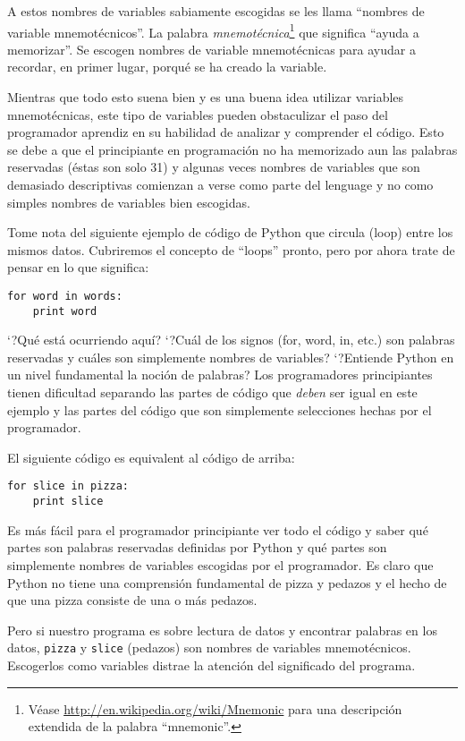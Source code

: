 \begin{ex}
A estos nombres de variables sabiamente escogidas se les llama ``nombres de variable mnemot\'ecnicos''. La palabra \emph{mnemot\'ecnica}\footnote{V\'ease 
\url{http://en.wikipedia.org/wiki/Mnemonic}
para una descripci\'on extendida de la palabra ``mnemonic''.} 
que significa ``ayuda a memorizar''.
Se escogen nombres de variable mnemot\'ecnicas para ayudar a recordar, en primer lugar, porqu\'e se ha creado la variable.

Mientras que todo esto suena bien y es una buena idea utilizar variables mnemot\'ecnicas, este tipo de variables pueden obstaculizar el paso del programador aprendiz en su habilidad de analizar y comprender el c\'odigo. Esto se debe a que el principiante en programaci\'on no ha memorizado aun las palabras reservadas (\'estas son solo 31) y algunas veces nombres de variables que son demasiado descriptivas comienzan a verse como
parte del lenguage y no como simples nombres de variables bien escogidas.

Tome nota del siguiente ejemplo de c\'odigo de Python que circula (loop) entre los mismos datos.  Cubriremos el concepto de ``loops'' pronto, pero por ahora trate de pensar en lo que significa:

\beforeverb
\begin{verbatim}
for word in words:
    print word
\end{verbatim}
\afterverb
%
`?Qu\'e est\'a ocurriendo aqu\'i?  `?Cu\'al de los signos (for, word, in, etc.) son palabras reservadas
y cu\'ales son simplemente nombres de variables?  `?Entiende Python en un nivel fundamental la noci\'on de palabras?  Los programadores principiantes tienen dificultad separando las partes de c\'odigo que \emph{deben} ser igual en este ejemplo y las partes del c\'odigo que son simplemente selecciones hechas por el programador.

El siguiente c\'odigo es equivalent al c\'odigo de arriba:

\beforeverb
\begin{verbatim}
for slice in pizza:
    print slice
\end{verbatim}
\afterverb
%
Es m\'as f\'acil para el programador principiante ver todo el c\'odigo y saber qu\'e partes son palabras reservadas definidas por Python y qu\'e partes son simplemente nombres de variables escogidas por el programador. Es claro que Python no tiene una comprensi\'on fundamental de pizza y pedazos y el hecho de que una pizza consiste de una o m\'as pedazos.

Pero si nuestro programa es sobre lectura de datos y encontrar palabras en los datos,
{\tt pizza} y {\tt slice} (pedazos) son nombres de variables mnemot\'ecnicos. Escogerlos como variables distrae la atenci\'on del significado del programa.


\end{ex}
